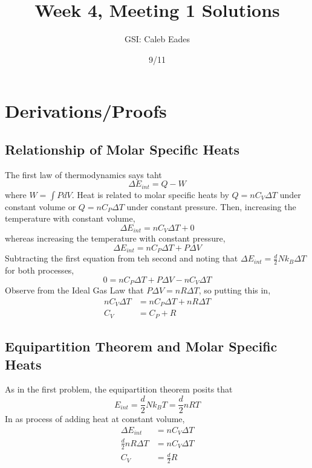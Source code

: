 \documentclass{article}
\begin{document}
	
\title{Week 4, Meeting 1 Solutions}
\author{GSI: Caleb Eades}
\date{9/11}
\maketitle

\section{Derivations/Proofs}

\subsection{Relationship of Molar Specific Heats}

The first law of thermodynamics says taht
\begin{equation}
\Delta E_{int} = Q-W
\end{equation}
where $W=\int PdV$. Heat is related to molar specific heats by $Q=nC_V\Delta T$ under constant volume or $Q=nC_P\Delta T$ under constant pressure. Then, increasing the temperature with constant volume,
\begin{equation}
\Delta E_{int} = nC_V\Delta T + 0
\end{equation}
whereas increasing the temperature with constant pressure,
\begin{equation}
\Delta E_{int} = nC_P\Delta T + P\Delta V
\end{equation}
Subtracting the first equation from teh second and noting that $\Delta E_{int} = \frac{d}{2}Nk_B\Delta T$ for both processes,
\begin{equation}
0 = nC_P\Delta T + P\Delta V - nC_V\Delta T
\end{equation}
Observe from the Ideal Gas Law that $P\Delta V = nR\Delta T$, so putting this in,
\begin{align*}
nC_V\Delta T &= nC_P\Delta T + nR\Delta T \\
C_V &= C_P + R
\end{align*}

\subsection{Equipartition Theorem and Molar Specific Heats}

As in the first problem, the equipartition theorem posits that
\begin{equation}
E_{int} = \frac{d}{2}Nk_B T = \frac{d}{2}nRT
\end{equation}
In as process of adding heat at constant volume,
\begin{align*}
\Delta E_{int} &= nC_V \Delta T \\
\frac{d}{2}nR\Delta T &= nC_V\Delta T \\
C_V &= \frac{d}{2}R
\end{align*}
\end{document}
